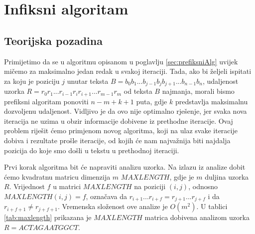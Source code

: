 \documentclass[times, utf8, zavrsni]{fer}
\begin{document}
\section{Infiksni algoritam}\label{sec:infiksniAlg}
\subsection{Teorijska pozadina}
Primijetimo da se u algoritmu opisanom u poglavlju \ref{sec:prefiksniAlg} uvijek mičemo za maksimalno jedan redak u svakoj iteraciji. Tada, ako bi željeli ispitati za koju je poziciju $j$ unutar teksta $B = b_{0}b_{1}...b_{j-1}b_{j}b_{j+1}...b_{n-1}b_{n}$, udaljenost uzorka $R = r_{0}r_{1}...r_{i-1}r_{i}r_{i+1}...r_{m-1}r_{m}$ od teksta $B$ najmanja, morali bismo prefiksni algoritam ponoviti $n-m+k+1$ puta, gdje $k$ predstavlja maksimalnu dozvoljenu udaljenost. Vidljivo je da ovo nije optimalno rješenje, jer svaka nova iteracija ne uzima u obzir informacije dobivene iz prethodne iteracije. Ovaj problem riješit ćemo primjenom novog algoritma, koji na ulaz svake iteracije dobiva i rezultate prošle iteracije, od kojih će nam najvažnija biti najdalja pozicija do koje smo došli u tekstu u prethodnoj iteraciji.
\begin{sloppypar}
Prvi korak algoritma bit će napraviti analizu uzorka. Na izlazu iz analize dobit ćemo kvadratnu matricu dimenzija $m$ $MAXLENGTH$, gdje je $m$ duljina uzorka $R$. Vrijednost $f$ u matrici $MAXLENGTH$ na poziciji $(i,j)$, odnosno $MAXLENGTH(i,j)=f$, označava da $r_{i+1}...r_{i+f} = r_{j+1}...r_{j+f}$ i da $r_{i+f+1}\neq r_{j+f+1}$. Vremenska složenost ove analize je $O(m^2)$. U tablici \ref{tab:maxlength} prikazana je $MAXLENGTH$ matrica dobivena analizom uzorka $R = ACTAGAATGGCT$.
\end{sloppypar}
\end{document}
